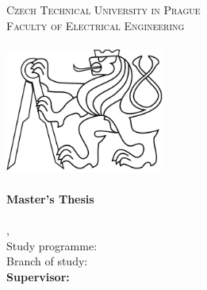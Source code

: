
\begin{titlepage}
  \begin{center}

    \textsc{\Large Czech Technical University in Prague}\\[1em]
    \textsc{\large Faculty of Electrical Engineering\\
    \Department\\
    [3em]
    }
    \includegraphics[height=4.1cm]{fig/ctu_lion.pdf}\\[3em]

    \textbf{\textsc{\Huge \Title}}\\[2em]

    \textbf{\Large Master's Thesis}\\[6em]

    \textbf{\huge \Author}\\[6em]

    {\large \Location, \Date}\\[3em]

    Study programme: \Programme\\
    Branch of study: \Field\\[4em]

    \textbf{Supervisor: \Supervisor}\\

    \vspace{2pt}

  \end{center}
\end{titlepage}
